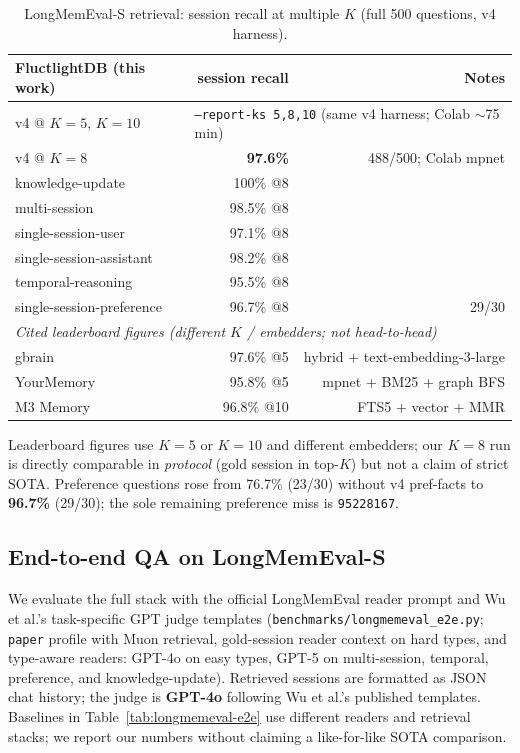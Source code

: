 \documentclass[11pt]{article}
\begin{document}
\begin{table}[h]
\centering
\caption{LongMemEval-S retrieval: session recall at multiple $K$ (full 500 questions, v4 harness).}
\begin{tabular}{lrr}
\toprule
\textbf{FluctlightDB (this work)} & \textbf{session recall} & \textbf{Notes} \\
\midrule
v4 @ $K{=}5$, $K{=}10$ & \multicolumn{2}{l}{\texttt{--report-ks 5,8,10} (same v4 harness; Colab $\sim$75\,min)} \\
v4 @ $K{=}8$ & \textbf{97.6\%} & 488/500; Colab mpnet \\
\quad knowledge-update & 100\% @8 & \\
\quad multi-session & 98.5\% @8 & \\
\quad single-session-user & 97.1\% @8 & \\
\quad single-session-assistant & 98.2\% @8 & \\
\quad temporal-reasoning & 95.5\% @8 & \\
\quad single-session-preference & 96.7\% @8 & 29/30 \\
\midrule
\multicolumn{3}{l}{\textit{Cited leaderboard figures (different $K$ / embedders; not head-to-head)}} \\
\midrule
gbrain & 97.6\% @5 & hybrid + text-embedding-3-large \\
YourMemory & 95.8\% @5 & mpnet + BM25 + graph BFS \\
M3 Memory & 96.8\% @10 & FTS5 + vector + MMR \\
\bottomrule
\end{tabular}
\end{table}

Leaderboard figures use $K{=}5$ or $K{=}10$ and different embedders; our $K{=}8$
run is directly comparable in \emph{protocol} (gold session in top-$K$) but not
a claim of strict SOTA. Preference questions rose from 76.7\% (23/30) without
v4 pref-facts to \textbf{96.7\%} (29/30); the sole remaining preference miss is
\texttt{95228167}.

\subsection{End-to-end QA on LongMemEval-S}
We evaluate the full stack with the official LongMemEval reader prompt and
Wu et al.'s task-specific GPT judge templates
(\texttt{benchmarks/longmemeval\_e2e.py}; \texttt{paper} profile with Muon
retrieval, gold-session reader context on hard types, and type-aware readers:
GPT-4o on easy types, GPT-5 on multi-session, temporal, preference, and
knowledge-update). Retrieved sessions are formatted as JSON chat history; the
judge is \textbf{GPT-4o} following Wu et al.'s published templates. Baselines in
Table~\ref{tab:longmemeval-e2e} use different readers and retrieval stacks; we
report our numbers without claiming a like-for-like SOTA comparison.
\end{document}
